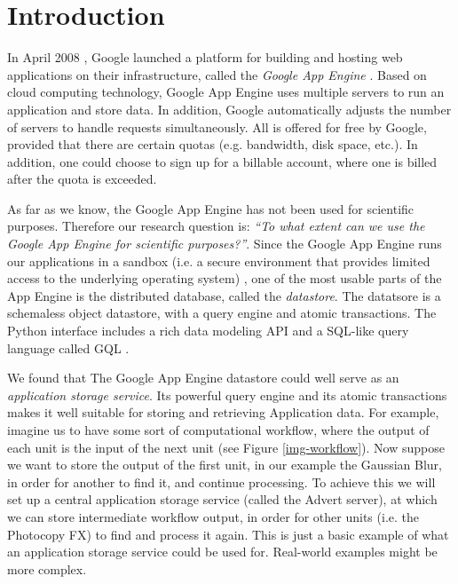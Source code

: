 \section{Introduction}
\label{introduction}
In April 2008 \cite{app-engine-intro}, Google launched a platform for building
and hosting web applications on their infrastructure, called the \emph{Google App
Engine} \cite{app-engine-www}. Based on cloud computing technology, Google App
Engine uses multiple servers to run an application and store data. In addition,
Google automatically adjusts the number of servers to handle requests
simultaneously. All is offered for free by Google, provided that there are
certain quotas (e.g. bandwidth, disk space, etc.). In addition, one could
choose to sign up for a billable account, where one is billed after the quota
is exceeded.

As far as we know, the Google App Engine has not been used for scientific
purposes. Therefore our research question is: \emph{``To what extent can we use
the Google App Engine for scientific purposes?''}. Since the Google App Engine
runs our applications in a sandbox (i.e. a secure environment that provides
limited access to the underlying operating system) \cite{app-engine-sandbox}, one
of the most usable parts of the App Engine is the distributed database, called
the \emph{datastore}. The datatsore is a schemaless object datastore, with a
query engine and atomic transactions. The Python interface includes a rich data
modeling API and a SQL-like query language called GQL
\cite{app-engine-datastore}.

We found that The Google App Engine datastore could well serve as an
\emph{application storage service}. Its powerful query engine and its atomic
transactions makes it well suitable for storing and retrieving Application
data. For example, imagine us to have some sort of computational workflow, where
the output of each unit is the input of the next unit (see Figure
\ref{img-workflow}). Now suppose we want to store the output of the first unit,
in our example the Gaussian Blur, in order for another to find it, and continue
processing. To achieve this we will set up a central application storage
service (called the Advert server), at which we can store intermediate workflow
output, in order for other units (i.e. the Photocopy FX) to find and process it
again. This is just a basic example of what an application storage service could
be used for. Real-world examples might be more complex.

